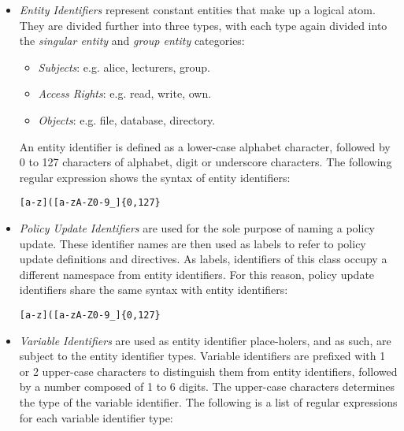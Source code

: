 \documentclass[10pt, twocolumn]{article}
\begin{document}
          \begin{itemize}
            \item
              {\em Entity Identifiers} represent constant entities that make up
              a logical atom. They are divided further into three types, with
              each type again divided into the {\em singular entity} and
              {\em group entity} categories:

              \begin{itemize}
                \item
                  {\em Subjects}: e.g. alice, lecturers, group.
                \item
                  {\em Access Rights}: e.g. read, write, own.
                \item
                  {\em Objects}: e.g. file, database, directory.
              \end{itemize}

              An entity identifier is defined as a lower-case alphabet
              character, followed by 0 to 127 characters of alphabet, digit or
              underscore characters. The following regular expression shows the
              syntax of entity identifiers:

              \begin{verbatim}[a-z]([a-zA-Z0-9_]{0,127}\end{verbatim}

            \item
              {\em Policy Update Identifiers} are used for the sole purpose of
              naming a policy update. These identifier names are then used as
              labels to refer to policy update definitions and directives. As
              labels, identifiers of this class occupy a different namespace
              from entity identifiers. For this reason, policy update
              identifiers share the same syntax with entity identifiers:

              \begin{verbatim}[a-z]([a-zA-Z0-9_]{0,127}\end{verbatim}

            \item
              {\em Variable Identifiers} are used as entity identifier
              place-holers, and as such, are subject to the entity identifier
              types. Variable identifiers are prefixed with 1 or 2 upper-case
              characters to distinguish them from entity identifiers, followed
              by a number composed of 1 to 6 digits. The upper-case characters
              determines the type of the variable identifier. The following is
              a list of regular expressions for each variable identifier type:


\end{itemize}
\end{document}
